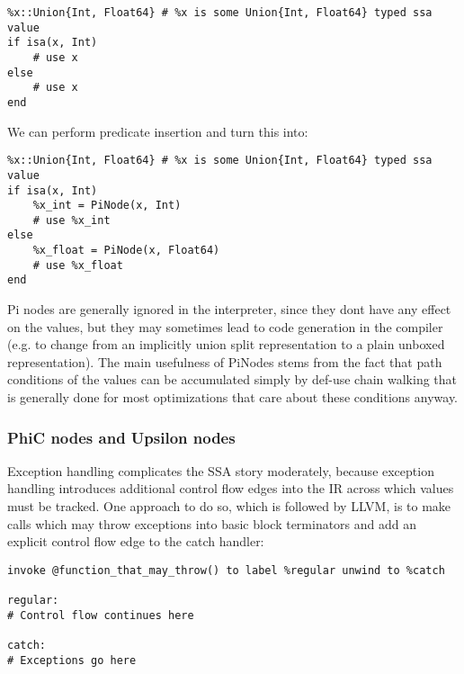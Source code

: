 \begin{verbatim}
%x::Union{Int, Float64} # %x is some Union{Int, Float64} typed ssa value
if isa(x, Int)
    # use x
else
    # use x
end
\end{verbatim}



We can perform predicate insertion and turn this into:




\begin{verbatim}
%x::Union{Int, Float64} # %x is some Union{Int, Float64} typed ssa value
if isa(x, Int)
    %x_int = PiNode(x, Int)
    # use %x_int
else
    %x_float = PiNode(x, Float64)
    # use %x_float
end
\end{verbatim}



Pi nodes are generally ignored in the interpreter, since they don{\textquotesingle}t have any effect on the values, but they may sometimes lead to code generation in the compiler (e.g. to change from an implicitly union split representation to a plain unboxed representation). The main usefulness of PiNodes stems from the fact that path conditions of the values can be accumulated simply by def-use chain walking that is generally done for most optimizations that care about these conditions anyway.



\hypertarget{1498305755051877944}{}


\subsubsection{PhiC nodes and Upsilon nodes}



Exception handling complicates the SSA story moderately, because exception handling introduces additional control flow edges into the IR across which values must be tracked. One approach to do so, which is followed by LLVM, is to make calls which may throw exceptions into basic block terminators and add an explicit control flow edge to the catch handler:




\begin{lstlisting}
invoke @function_that_may_throw() to label %regular unwind to %catch

regular:
# Control flow continues here

catch:
# Exceptions go here
\end{lstlisting}



